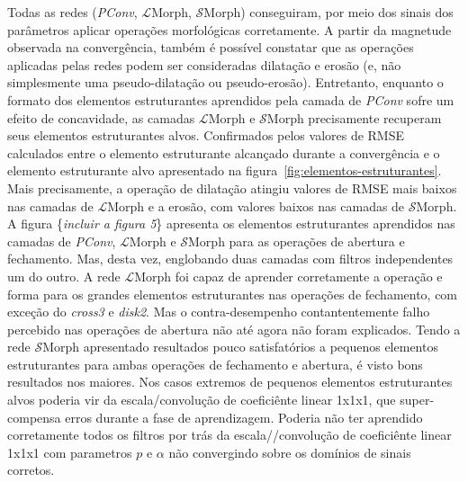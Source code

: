 Todas as redes (\emph{PConv}, $\mathcal{L}$Morph, $\mathcal{S}$Morph) conseguiram, por meio dos sinais dos parâmetros aplicar operações morfológicas corretamente.
A partir da magnetude observada na convergência, também é possível constatar que as operações aplicadas pelas redes podem ser consideradas dilatação e erosão (e, não simplesmente uma pseudo-dilatação ou pseudo-erosão).
Entretanto, enquanto o formato dos elementos estruturantes aprendidos pela camada de \emph{PConv} sofre um efeito de concavidade, as camadas $\mathcal{L}$Morph e $\mathcal{S}$Morph precisamente recuperam seus elementos estruturantes alvos.
Confirmados pelos valores de RMSE calculados entre o elemento estruturante alcançado durante a convergência e o elemento estruturante alvo apresentado na figura~\ref{fig:elementos-estruturantes}.
Mais precisamente, a operação de dilatação atingiu valores de RMSE mais baixos nas camadas de $\mathcal{L}$Morph e a erosão, com valores baixos nas camadas de $\mathcal{S}$Morph.
A figura \{\emph{incluir a figura 5}\} apresenta os elementos estruturantes aprendidos nas camadas de \emph{PConv}, $\mathcal{L}$Morph e $\mathcal{S}$Morph para as operações de abertura e fechamento.
Mas, desta vez, englobando duas camadas com filtros independentes um do outro.
A rede $\mathcal{L}$Morph foi capaz de aprender corretamente a operação e forma para os grandes elementos estruturantes nas operações de fechamento, com exceção do \emph{cross3} e \emph{disk2}.
Mas o contra-desempenho contantentemente falho percebido nas operações de abertura não até agora não foram explicados.
Tendo a rede $\mathcal{S}$Morph apresentado resultados pouco satisfatórios a pequenos elementos estruturantes para ambas operações de fechamento e abertura, é visto bons resultados nos maiores.
Nos casos extremos de pequenos elementos estruturantes alvos poderia vir da escala/convolução de coeficiênte linear 1x1x1, que super-compensa erros durante a fase de aprendizagem.
Poderia não ter aprendido corretamente todos os filtros por trás da escala//convolução de coeficiênte linear 1x1x1 com parametros $p$ e $\alpha$ não convergindo sobre os domínios de sinais corretos.


